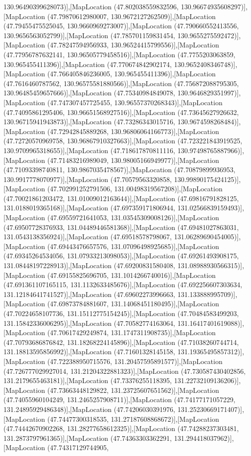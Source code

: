 130.96490399628073)],[MapLocation (47.802038559832596, 130.96674935608297)],[MapLocation (47.79870612980007, 130.9672127262509)],[MapLocation (47.79455475525045, 130.9660969273007)],[MapLocation (47.790660552413556, 130.9656563052799)],[MapLocation (47.785701159831454, 130.9655275592472)],[MapLocation (47.78247594956933, 130.96524415799556)],[MapLocation (47.77956787632141, 130.96505779458516)],[MapLocation (47.7755203063859, 130.965455411396)],[MapLocation (47.770674842902174, 130.9652408346748)],[MapLocation (47.766405846236005, 130.965455411396)],[MapLocation (47.7616460787562, 130.96575581880566)],[MapLocation (47.756872088795305, 130.96485459657666)],[MapLocation (47.75340984849078, 130.9646829351997)],[MapLocation (47.747307457725455, 130.96557370268343)],[MapLocation (47.74095861295406, 130.96651568927516)],[MapLocation (47.73645627926632, 130.96715941943873)],[MapLocation (47.73286343015716, 130.9674598268484)],[MapLocation (47.72942845889268, 130.96806064166773)],[MapLocation (47.72720570969758, 130.96867910327663)],[MapLocation (47.723221843919525, 130.9709965318655)],[MapLocation (47.718617870811116, 130.97498765887966)],[MapLocation (47.71483216989049, 130.98005166949977)],[MapLocation (47.71093398740811, 130.9867035478567)],[MapLocation (47.70879899936953, 130.9917778070977)],[MapLocation (47.70579563320858, 130.99890175424125)],[MapLocation (47.702991252791506, 131.00498319567208)],[MapLocation (47.70021861203472, 131.01009012163644)],[MapLocation (47.69816791828125, 131.0188019365168)],[MapLocation (47.697359171806944, 131.02566839159493)],[MapLocation (47.69559721641053, 131.03545309008126)],[MapLocation (47.69507728376933, 131.04489446581368)],[MapLocation (47.69481027863031, 131.0543138356924)],[MapLocation (47.69518578798067, 131.06289690454005)],[MapLocation (47.69443476657576, 131.07096498925685)],[MapLocation (47.69345264534056, 131.07933213098053)],[MapLocation (47.69261493908175, 131.08448197228913)],[MapLocation (47.69200831580408, 131.08988930566315)],[MapLocation (47.69155825696705, 131.1014266740016)],[MapLocation (47.691361107165115, 131.1132633485676)],[MapLocation (47.692256607303634, 131.12184641741527)],[MapLocation (47.69602273996663, 131.133888995709)],[MapLocation (47.69873784881607, 131.14068451180495)],[MapLocation (47.70224658107736, 131.15112775154245)],[MapLocation (47.70484583499203, 131.15842336006295)],[MapLocation (47.70582774163064, 131.16417401619088)],[MapLocation (47.70617429249874, 131.1747311908735)],[MapLocation (47.70793686876842, 131.18268224145896)],[MapLocation (47.71038260744714, 131.18813595856992)],[MapLocation (47.71601328145158, 131.19365495857312)],[MapLocation (47.722388950715576, 131.20457595891577)],[MapLocation (47.726777029927014, 131.21204322881323)],[MapLocation (47.730587430402856, 131.2179655463181)],[MapLocation (47.73376255118395, 131.22732109136206)],[MapLocation (47.73663448129822, 131.23725607651562)],[MapLocation (47.74055960104249, 131.2465257908711)],[MapLocation (47.74177171057229, 131.24895929486348)],[MapLocation (47.74206030391976, 131.25230669171407)],[MapLocation (47.74477300318535, 131.27187608868672)],[MapLocation (47.74442670902268, 131.28277658612325)],[MapLocation (47.74288237303481, 131.2873797961365)],[MapLocation (47.74363303362291, 131.294418037962)],[MapLocation (47.74317129744905, 